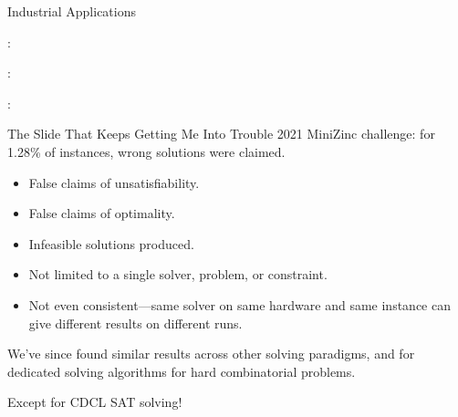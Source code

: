 \documentclass[aspectratio=169,compress,10pt]{beamer}
\begin{document}
\begin{frame}{Industrial Applications}
\begin{center}
\begin{minipage}{12cm}
    \medskip

     \driverb\drivera:
    \chair\trashpanda\parcel\parcel\present


    \medskip

     \driverb\driverb: \tree\parcel\chair\present

    \medskip

     \drivera\phantom{\drivera}:
    \parcel\parcel\laptop\parcel\parcel
\end{minipage}
\end{center}
\end{frame}

\begin{frame}{The Slide That Keeps Getting Me Into Trouble}
    2021 MiniZinc challenge: for 1.28\% of instances, wrong solutions were claimed.

    \medskip

    \begin{itemize}
        \item False claims of unsatisfiability.
        \item False claims of optimality.
        \item Infeasible solutions produced.
        \item Not limited to a single solver, problem, or constraint.
        \item Not even consistent---same solver on same hardware and same instance can give
            different results on different runs.
    \end{itemize}

    \medskip \pause
    We've since found similar results across other solving paradigms, and for dedicated solving
    algorithms for hard combinatorial problems.

    \medskip \pause
    Except for CDCL SAT solving!
\end{frame}
\end{document}
